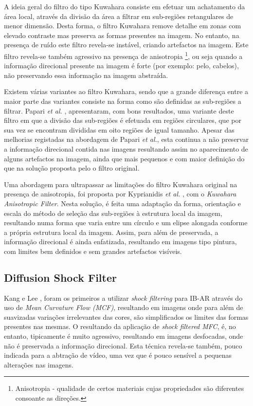 A ideia geral do filtro do tipo Kuwahara consiste em efetuar um achatamento da área local, através da divisão da área a filtrar em sub-regiões retangulares de menor dimensão. Desta forma, o filtro Kuwahara remove detalhe em zonas com elevado contraste mas preserva as formas presentes na imagem. No entanto, na presença de ruído este filtro revela-se instável, criando artefactos na imagem. Este filtro revela-se também agressivo na presença de anisotropia \footnote{Anisotropia - qualidade de certos materiais cujas propriedades são diferentes consoante as direções.}, ou seja quando a informação direcional presente na imagem é forte (por exemplo: pelo, cabelos), não preservando essa informação na imagem abstraída.

Existem várias variantes ao filtro Kuwahara, sendo que a grande diferença entre a maior parte das variantes consiste na forma como são definidas as sub-regiões a filtrar. Papari \textit{et al.} \cite{p}, apresentaram, com bons resultados, uma variante deste filtro em que a divisão das sub-regiões é efetuada em regiões circulares, que por sua vez se encontram divididas em oito regiões de igual tamanho. Apesar das melhorias registadas na abordagem de Papari \textit{et al.}, esta continua a não preservar a informação direcional contida nas imagens resultando assim no aparecimento de alguns artefactos na imagem, ainda que mais pequenos e com maior definição do que na solução proposta pelo o filtro original.

Uma abordagem para ultrapassar as limitações do filtro Kuwahara original na presença de anisotropia, foi proposta por Kyprianidis \textit{et al.} \cite{K}, com o \textit{Kuwahara Anisotropic Filter}. Nesta solução, é feita uma adaptação da forma, orientação e escala do  método de seleção das sub-regiões à estrutura local da imagem, resultando numa forma que varia entre um círculo e um elipse alongada conforme a própria estrutura local da imagem. Assim, para além de preservada, a informação direcional é ainda enfatizada, resultando em imagens tipo pintura, com limites bem definidos e sem grandes artefactos visíveis.

\subsection{Diffusion Shock Filter}
Kang e Lee \cite{KL}, foram os primeiros a utilizar \textit{shock filtering} para IB-AR através do uso de \textit{Mean Curvature Flow (MCF)}, resultando em imagens onde para além de suavizadas variações irrelevantes das cores, são simplificados os limites das formas presentes nas mesmas. O resultando da aplicação de \textit{shock filtered MFC}, é, no entanto, tipicamente é muito agressivo, resultando em imagens desfocadas, onde não é preservada a  informação direcional. Esta técnica revela-se também, pouco indicada para a abtração de vídeo, uma vez que é pouco sensível a pequenas alterações nas imagens.

